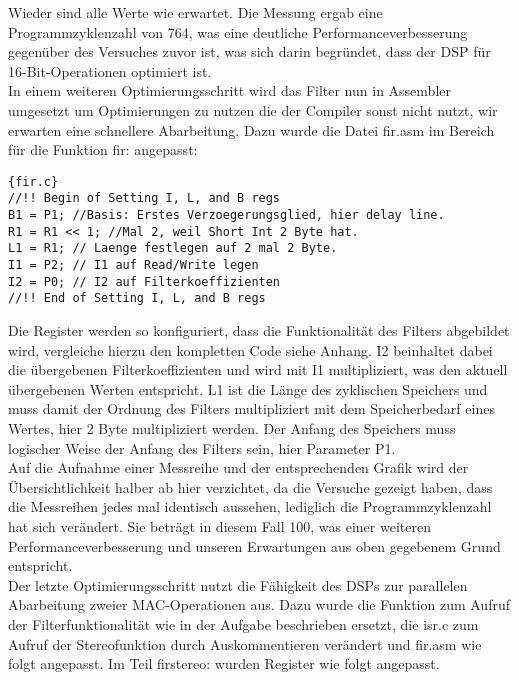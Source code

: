 Wieder sind alle Werte wie erwartet.
Die Messung ergab eine Programmzyklenzahl von 764, was eine deutliche Performanceverbesserung gegen\"uber des Versuches zuvor ist, was sich darin begr\"undet, dass der DSP f\"ur 16-Bit-Operationen optimiert ist.\\
In einem weiteren Optimierungsschritt wird das Filter nun in Assembler umgesetzt um Optimierungen zu nutzen die der Compiler sonst nicht nutzt, wir erwarten eine schnellere Abarbeitung.
Dazu wurde die Datei fir.asm im Bereich f\"ur die Funktion \textunderscore fir: angepasst:
\begin{adjustbox}{width=\textwidth,height=\textheight,keepaspectratio}
 \begin{lstlisting}[title=fir.c]{fir.c}
//!! Begin of Setting I, L, and B regs	
B1 = P1; //Basis: Erstes Verzoegerungsglied, hier delay line.
R1 = R1 << 1; //Mal 2, weil Short Int 2 Byte hat.
L1 = R1; // Laenge festlegen auf 2 mal 2 Byte.
I1 = P2; // I1 auf Read/Write legen
I2 = P0; // I2 auf Filterkoeffizienten
//!! End of Setting I, L, and B regs

\end{lstlisting}
\end{adjustbox}
Die Register werden so konfiguriert, dass die Funktionalität des Filters abgebildet wird, vergleiche hierzu den kompletten Code siehe Anhang. I2 beinhaltet dabei die \"ubergebenen Filterkoeffizienten und wird mit I1 multipliziert, was den aktuell \"ubergebenen Werten entspricht. L1 ist die L\"ange des zyklischen Speichers und muss damit der Ordnung des Filters multipliziert mit dem Speicherbedarf eines Wertes, hier 2 Byte multipliziert werden. Der Anfang des Speichers muss logischer Weise der Anfang des Filters sein, hier Parameter P1.\\

Auf die Aufnahme einer Messreihe und der entsprechenden Grafik wird der Übersichtlichkeit halber ab hier verzichtet, da die Versuche gezeigt haben, dass die Messreihen jedes mal identisch aussehen, lediglich die Programmzyklenzahl hat sich verändert. Sie beträgt in diesem Fall 100, was einer weiteren Performanceverbesserung und unseren Erwartungen aus oben gegebenem Grund entspricht.\\
Der letzte Optimierungsschritt nutzt die Fähigkeit des DSPs zur parallelen Abarbeitung zweier MAC-Operationen aus. Dazu wurde die Funktion zum Aufruf der Filterfunktionalität wie in der Aufgabe beschrieben ersetzt, die isr.c zum Aufruf der Stereofunktion durch Auskommentieren verändert und fir.asm wie folgt angepasst. Im Teil \textunderscore fir\textunderscore stereo: wurden Register wie folgt angepasst.

